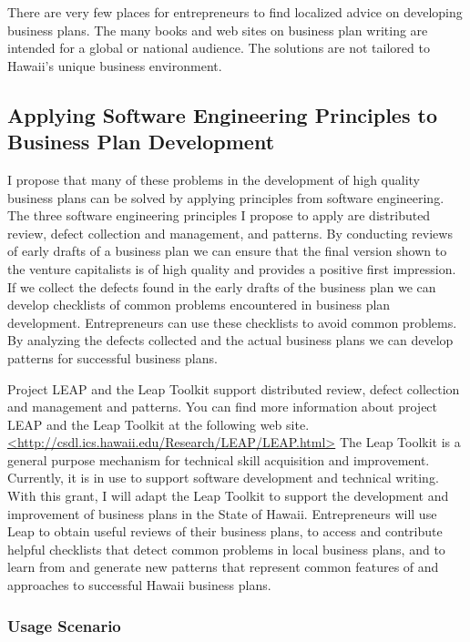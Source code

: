 There are very few places for entrepreneurs to find localized advice on
developing business plans.  The many books and web sites on business plan
writing are intended for a global or national audience.  The solutions are
not tailored to Hawaii's unique business environment.


\subsection{Applying Software Engineering Principles to Business Plan Development}

I propose that many of these problems in the development of high quality
business plans can be solved by applying principles from software
engineering.  The three software engineering principles I propose to apply
are distributed review, defect collection and management, and patterns.  By
conducting reviews of early drafts of a business plan we can ensure that
the final version shown to the venture capitalists is of high quality and
provides a positive first impression.  If we collect the defects found in
the early drafts of the business plan we can develop checklists of common
problems encountered in business plan development.  Entrepreneurs can use
these checklists to avoid common problems.  By analyzing the defects
collected and the actual business plans we can develop patterns for
successful business plans.


Project LEAP and the Leap Toolkit support distributed review, defect
collection and management and patterns.  You can find more information
about project LEAP and the Leap Toolkit at the following web site.
\url{<http://csdl.ics.hawaii.edu/Research/LEAP/LEAP.html>} The Leap Toolkit
is a general purpose mechanism for technical skill acquisition and
improvement. Currently, it is in use to support software development and
technical writing. With this grant, I will adapt the Leap Toolkit to
support the development and improvement of business plans in the State of
Hawaii. Entrepreneurs will use Leap to obtain useful reviews of their
business plans, to access and contribute helpful checklists that detect
common problems in local business plans, and to learn from and generate
new patterns that represent common features of and approaches to successful
Hawaii business plans.

\subsubsection{Usage Scenario}

